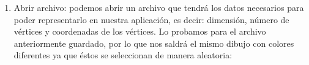 \begin{enumerate}
\begin{enumerate}
            \item Abrir archivo: podemos abrir un archivo que tendrá los datos necesarios para poder representarlo en nuestra aplicación, es decir: dimensión, número de vértices y coordenadas de los vértices. Lo probamos para el archivo anteriormente guardado, por lo que nos saldrá el mismo dibujo con colores diferentes ya que éstos se seleccionan de manera aleatoria: 
            \begin{figure}[H]
                \begin{center}               
\end{center}
\end{figure}
\end{enumerate}
\end{enumerate}
